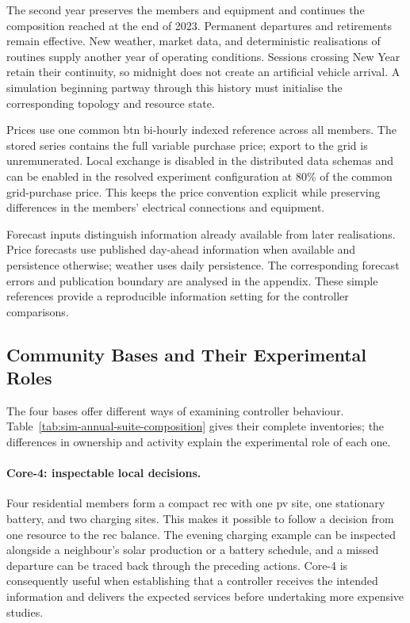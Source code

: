 The second year preserves the members and equipment and continues the composition reached at the end of 2023. Permanent departures and retirements remain effective. New weather, market data, and deterministic realisations of routines supply another year of operating conditions. Sessions crossing New Year retain their continuity, so midnight does not create an artificial vehicle arrival. A simulation beginning partway through this history must initialise the corresponding topology and resource state.

Prices use one common \gls{btn} bi-hourly indexed reference across all members. The stored series contains the full variable purchase price; export to the grid is unremunerated. Local exchange is disabled in the distributed data schemas and can be enabled in the resolved experiment configuration at 80\% of the common grid-purchase price. This keeps the price convention explicit while preserving differences in the members' electrical connections and equipment.

Forecast inputs distinguish information already available from later realisations. Price forecasts use published day-ahead information when available and persistence otherwise; weather uses daily persistence. The corresponding forecast errors and publication boundary are analysed in the appendix. These simple references provide a reproducible information setting for the controller comparisons.

\subsection{Community Bases and Their Experimental Roles}
\label{sec:sim-dataset-composition}

The four bases offer different ways of examining controller behaviour. Table~\ref{tab:sim-annual-suite-composition} gives their complete inventories; the differences in ownership and activity explain the experimental role of each one.

\paragraph{Core-4: inspectable local decisions.}
Four residential members form a compact \gls{rec} with one \gls{pv} site, one stationary battery, and two charging sites. This makes it possible to follow a decision from one resource to the \gls{rec} balance. The evening charging example can be inspected alongside a neighbour's solar production or a battery schedule, and a missed departure can be traced back through the preceding actions. Core-4 is consequently useful when establishing that a controller receives the intended information and delivers the expected services before undertaking more expensive studies.

